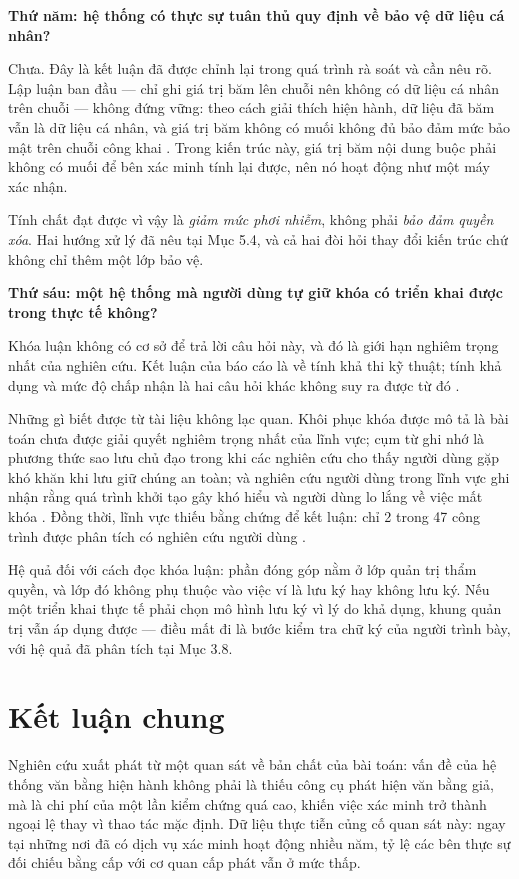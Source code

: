 \noindent \textbf{Thứ năm: hệ thống có thực sự tuân thủ quy định về bảo vệ dữ liệu cá nhân?}

Chưa. Đây là kết luận đã được chỉnh lại trong quá trình rà soát và cần nêu rõ. Lập luận ban đầu --- chỉ ghi giá trị băm lên chuỗi nên không có dữ liệu cá nhân trên chuỗi --- không đứng vững: theo cách giải thích hiện hành, dữ liệu đã băm vẫn là dữ liệu cá nhân, và giá trị băm không có muối không đủ bảo đảm mức bảo mật trên chuỗi công khai \cite{EDPB2025}. Trong kiến trúc này, giá trị băm nội dung buộc phải không có muối để bên xác minh tính lại được, nên nó hoạt động như một máy xác nhận.

Tính chất đạt được vì vậy là \emph{giảm mức phơi nhiễm}, không phải \emph{bảo đảm quyền xóa}. Hai hướng xử lý đã nêu tại Mục 5.4, và cả hai đòi hỏi thay đổi kiến trúc chứ không chỉ thêm một lớp bảo vệ.

\noindent \textbf{Thứ sáu: một hệ thống mà người dùng tự giữ khóa có triển khai được trong thực tế không?}

Khóa luận không có cơ sở để trả lời câu hỏi này, và đó là giới hạn nghiêm trọng nhất của nghiên cứu. Kết luận của báo cáo là về tính khả thi kỹ thuật; tính khả dụng và mức độ chấp nhận là hai câu hỏi khác không suy ra được từ đó \cite{SSI_Adoption2025}.

Những gì biết được từ tài liệu không lạc quan. Khôi phục khóa được mô tả là bài toán chưa được giải quyết nghiêm trọng nhất của lĩnh vực; cụm từ ghi nhớ là phương thức sao lưu chủ đạo trong khi các nghiên cứu cho thấy người dùng gặp khó khăn khi lưu giữ chúng an toàn; và nghiên cứu người dùng trong lĩnh vực ghi nhận rằng quá trình khởi tạo gây khó hiểu và người dùng lo lắng về việc mất khóa \cite{Ambati2026, Zaeem2021}. Đồng thời, lĩnh vực thiếu bằng chứng để kết luận: chỉ 2 trong 47 công trình được phân tích có nghiên cứu người dùng \cite{Ambati2026}.

Hệ quả đối với cách đọc khóa luận: phần đóng góp nằm ở lớp quản trị thẩm quyền, và lớp đó không phụ thuộc vào việc ví là lưu ký hay không lưu ký. Nếu một triển khai thực tế phải chọn mô hình lưu ký vì lý do khả dụng, khung quản trị vẫn áp dụng được --- điều mất đi là bước kiểm tra chữ ký của người trình bày, với hệ quả đã phân tích tại Mục 3.8.

\section{Kết luận chung}

Nghiên cứu xuất phát từ một quan sát về bản chất của bài toán: vấn đề của hệ thống văn bằng hiện hành không phải là thiếu công cụ phát hiện văn bằng giả, mà là chi phí của một lần kiểm chứng quá cao, khiến việc xác minh trở thành ngoại lệ thay vì thao tác mặc định. Dữ liệu thực tiễn củng cố quan sát này: ngay tại những nơi đã có dịch vụ xác minh hoạt động nhiều năm, tỷ lệ các bên thực sự đối chiếu bằng cấp với cơ quan cấp phát vẫn ở mức thấp.

